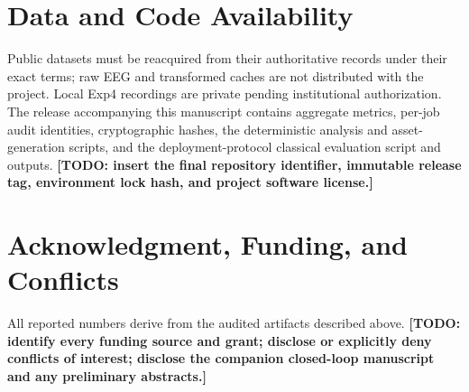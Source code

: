 \documentclass[journal,twoside,web]{template/ieeecolor2-tectonic}
\begin{document}
\section*{Data and Code Availability}

Public datasets must be reacquired from their authoritative records under their exact terms; raw EEG and transformed caches are not distributed with the project. Local Exp4 recordings are private pending institutional authorization. The release accompanying this manuscript contains aggregate metrics, per-job audit identities, cryptographic hashes, the deterministic analysis and asset-generation scripts, and the deployment-protocol classical evaluation script and outputs. \textbf{[TODO: insert the final repository identifier, immutable release tag, environment lock hash, and project software license.]}

\section*{Acknowledgment, Funding, and Conflicts}

All reported numbers derive from the audited artifacts described above. \textbf{[TODO: identify every funding source and grant; disclose or explicitly deny conflicts of interest; disclose the companion closed-loop manuscript and any preliminary abstracts.]}



\end{document}
